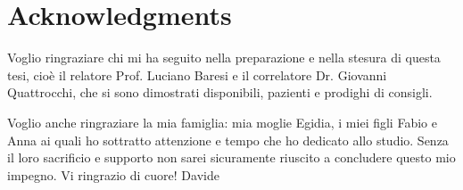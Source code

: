 
\bigskip

\begingroup
\let\clearpage\relax
\let\cleardoublepage\relax
\let\cleardoublepage\relax
\chapter*{Acknowledgments}
Voglio ringraziare chi mi ha seguito nella preparazione e nella stesura di questa tesi, cioè il relatore Prof. Luciano Baresi e il correlatore Dr. Giovanni Quattrocchi, che si sono dimostrati disponibili, pazienti e prodighi
di consigli. 

Voglio anche ringraziare la mia famiglia: mia moglie Egidia, i miei 
figli Fabio e Anna ai quali ho sottratto attenzione e tempo che ho dedicato
allo studio. Senza il loro sacrificio e supporto non sarei sicuramente
riuscito a concludere questo mio impegno. 
Vi ringrazio di cuore!
\flushright Davide

\endgroup